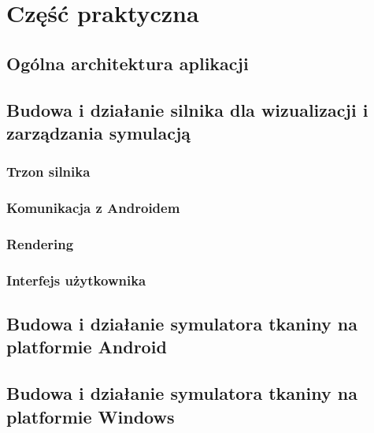 \chapter{Część praktyczna}
\label{t:praktyka}

	\section{Ogólna architektura aplikacji}
	\label{t:praktyka:ogolne}
	
	
	\section{Budowa i działanie silnika dla wizualizacji i zarządzania symulacją}
	\label{t:praktyka:silnik}
	
		\subsection{Trzon silnika}
		\label{t:praktyka:silnik:trzon}
		
		\subsection{Komunikacja z Androidem}
		\label{t:praktyka:silnik:andro}
		
		\subsection{Rendering}
		\label{t:praktyka:silnik:render}
		
		\subsection{Interfejs użytkownika}
		\label{t:praktyka:silnik:gui}
	
	
	\section{Budowa i działanie symulatora tkaniny na platformie Android}
	\label{t:praktyka:symulacja}
	
	
	\section{Budowa i działanie symulatora tkaniny na platformie Windows}
	\label{t:praktyka:symulacjapc}
	
